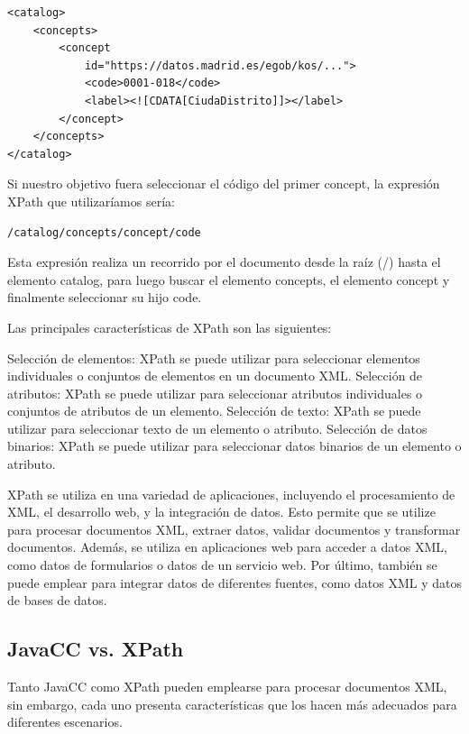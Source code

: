 \lstset{inputencoding=utf8/latin1}
\begin{lstlisting}
<catalog>
    <concepts>
        <concept
            id="https://datos.madrid.es/egob/kos/...">
            <code>0001-018</code>
            <label><![CDATA[CiudaDistrito]]></label>
        </concept>
    </concepts>
</catalog>

\end{lstlisting}

Si nuestro objetivo fuera seleccionar el código del primer concept, la expresión XPath que utilizaríamos sería:

\lstset{inputencoding=utf8/latin1}
\begin{lstlisting}
/catalog/concepts/concept/code
\end{lstlisting}

Esta expresión realiza un recorrido por el documento desde la raíz (/) hasta el elemento catalog, para luego buscar el elemento concepts, el elemento concept y finalmente seleccionar su hijo code.

Las principales características de XPath son las siguientes:

Selección de elementos: XPath se puede utilizar para seleccionar elementos individuales o conjuntos de elementos en un documento XML.
Selección de atributos: XPath se puede utilizar para seleccionar atributos individuales o conjuntos de atributos de un elemento.
Selección de texto: XPath se puede utilizar para seleccionar texto de un elemento o atributo.
Selección de datos binarios: XPath se puede utilizar para seleccionar datos binarios de un elemento o atributo.

XPath se utiliza en una variedad de aplicaciones, incluyendo el procesamiento de XML, el desarrollo web, y la integración de datos. Esto permite que se utilize para procesar documentos XML, extraer datos, validar documentos y transformar documentos. Además, se utiliza en aplicaciones web para acceder a datos XML, como datos de formularios o datos de un servicio web. Por último, también se puede emplear para integrar datos de diferentes fuentes, como datos XML y datos de bases de datos.

\subsection{JavaCC vs. XPath}

\noindent Tanto JavaCC como XPath pueden emplearse para procesar documentos XML, sin embargo, cada uno presenta características que los hacen más adecuados para diferentes escenarios.

